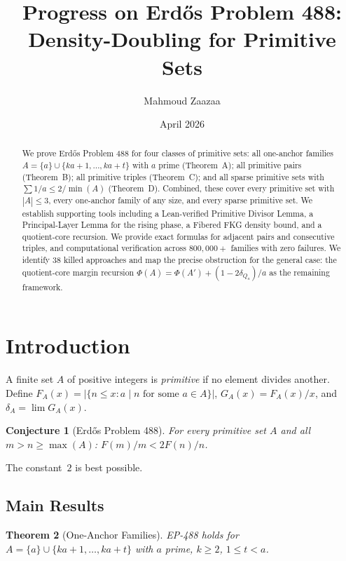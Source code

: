 \documentclass[11pt,a4paper]{article}
\title{Progress on Erd\H{o}s Problem 488:\\Density-Doubling for Primitive Sets}
\author{Mahmoud Zaazaa}
\date{April 2026}
\newtheorem{theorem}{Theorem}[section]
\newtheorem{conjecture}[theorem]{Conjecture}
\theoremstyle{definition}
\begin{document}
\maketitle

\begin{abstract}
We prove Erd\H{o}s Problem 488 for four classes of primitive sets:
all one-anchor families $A = \{a\} \cup \{ka{+}1,\ldots,ka{+}t\}$ with
$a$ prime (Theorem~A); all primitive pairs (Theorem~B); all primitive
triples (Theorem~C); and all sparse primitive sets with
$\sum 1/a \leq 2/\min(A)$ (Theorem~D). Combined, these cover every
primitive set with $|A| \leq 3$, every one-anchor family of any size,
and every sparse primitive set. We establish supporting tools including
a Lean-verified Primitive Divisor Lemma, a Principal-Layer Lemma for
the rising phase, a Fibered FKG density bound, and a quotient-core
recursion. We provide exact formulas for adjacent pairs and consecutive
triples, and computational verification across $800{,}000+$ families
with zero failures. We identify 38 killed approaches and map the
precise obstruction for the general case: the quotient-core margin
recursion $\Phi(A) = \Phi(A') + (1 - 2\delta_{Q_a})/a$ as the
remaining framework.
\end{abstract}

\tableofcontents
\newpage

\section{Introduction}

A finite set $A$ of positive integers is \emph{primitive} if no element
divides another. Define $F_A(x) = |\{n \leq x : a \mid n \text{ for some }
a \in A\}|$, $G_A(x) = F_A(x)/x$, and $\delta_A = \lim G_A(x)$.

\begin{conjecture}[Erd\H{o}s Problem 488]\label{conj:main}
For every primitive set $A$ and all $m > n \geq \max(A)$:
$F(m)/m < 2F(n)/n$.
\end{conjecture}

The constant~$2$ is best possible.

\subsection{Main Results}

\begin{theorem}[One-Anchor Families]\label{thm:anchor}
EP-488 holds for $A = \{a\} \cup \{ka{+}1, \ldots, ka{+}t\}$ with
$a$ prime, $k \geq 2$, $1 \leq t < a$.
\end{theorem}
\end{document}
